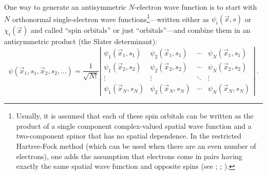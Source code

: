 \documentclass[12pt,onecolumn,secnumarabic,amsmath,amssymb,balancelastpage,nofootinbib]{article}
\begin{document}
One way to generate an antisymmetric $N$-electron wave function is to start with $N$ orthonormal single-electron wave functions\footnote{Usually, it is assumed that each of these spin orbitals can be written as the product of a single component complex-valued spatial wave function and a two-component spinor that has no spatial dependence.  In the restricted Hartree-Fock method (which can be used when there are an even number of electrons), one adds the assumption that electrons come in pairs having exactly the same spatial wave function and opposite spins (see \cite[ch.\ 3]{szaboQC}; \cite[pg.\ 12]{parryang}; \cite[sec.\ 7.17]{atkins2011}).}---written either as $\psi_i(\vec{x},s)$ or $\chi_i(\vec{x})$ and called ``spin orbitals'' or just ``orbitals''---and combine them in an antisymmetric product (the Slater determinant):
\begin{equation}
\psi(\vec{x}_1, s_1,\vec{x}_2, s_2, ...)=\frac{1}{\sqrt{N!}} \left| \begin{matrix}
\psi_1(\vec{x}_1, s_1) & \psi_2(\vec{x}_1, s_1) & \cdots & \psi_N(\vec{x}_1, s_1)\\
\psi_1(\vec{x}_2, s_2) & \psi_2(\vec{x}_2, s_2) & \cdots & \psi_N(\vec{x}_2, s_2)\\
\vdots & \vdots & \ddots & \vdots\\
\psi_1(\vec{x}_N, s_N) & \psi_2(\vec{x}_N, s_N) & \cdots & \psi_N(\vec{x}_N, s_N)
\end{matrix} \right|
\ .
\label{slaterdeterminant}
\end{equation}
\end{document}
